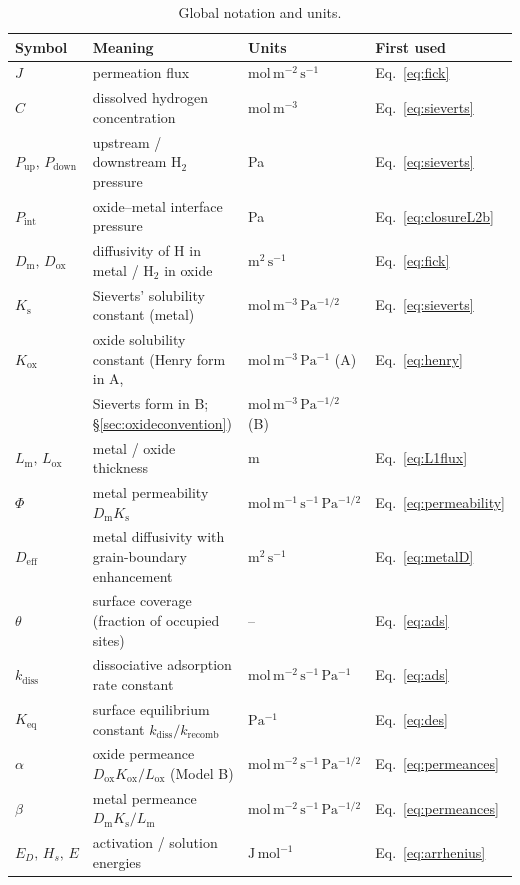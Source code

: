 \documentclass[11pt,a4paper]{article}
\newcommand{\Pup}{P_{\mathrm{up}}}
\newcommand{\Pdown}{P_{\mathrm{down}}}
\newcommand{\Pint}{P_{\mathrm{int}}}
\newcommand{\Ks}{K_{\mathrm{s}}}
\newcommand{\Kox}{K_{\mathrm{ox}}}
\newcommand{\Keq}{K_{\mathrm{eq}}}
\newcommand{\Dm}{D_{\mathrm{m}}}
\newcommand{\Dox}{D_{\mathrm{ox}}}
\newcommand{\Deff}{D_{\mathrm{eff}}}
\newcommand{\Lm}{L_{\mathrm{m}}}
\newcommand{\Lox}{L_{\mathrm{ox}}}
\newcommand{\kdiss}{k_{\mathrm{diss}}}
\newcommand{\krec}{k_{\mathrm{recomb}}}
\begin{document}
\begin{table}[h]
\centering
\caption{Global notation and units.}
\label{tab:notation}
\begin{tabular}{llll}
\toprule
Symbol & Meaning & Units & First used \\
\midrule
$J$ & permeation flux & $\mathrm{mol\,m^{-2}\,s^{-1}}$ & Eq.~\eqref{eq:fick} \\
$C$ & dissolved hydrogen concentration & $\mathrm{mol\,m^{-3}}$ & Eq.~\eqref{eq:sieverts} \\
$\Pup,\,\Pdown$ & upstream / downstream $\mathrm{H_2}$ pressure & Pa & Eq.~\eqref{eq:sieverts} \\
$\Pint$ & oxide--metal interface pressure & Pa & Eq.~\eqref{eq:closureL2b} \\
$\Dm,\,\Dox$ & diffusivity of H in metal / $\mathrm{H_2}$ in oxide & $\mathrm{m^2\,s^{-1}}$ & Eq.~\eqref{eq:fick} \\
$\Ks$ & Sieverts' solubility constant (metal) & $\mathrm{mol\,m^{-3}\,Pa^{-1/2}}$ & Eq.~\eqref{eq:sieverts} \\
$\Kox$ & oxide solubility constant (Henry form in A, & $\mathrm{mol\,m^{-3}\,Pa^{-1}}$ (A) & Eq.~\eqref{eq:henry} \\
 & \quad Sieverts form in B; \S\ref{sec:oxideconvention}) & $\mathrm{mol\,m^{-3}\,Pa^{-1/2}}$ (B) & \\
$\Lm,\,\Lox$ & metal / oxide thickness & m & Eq.~\eqref{eq:L1flux} \\
$\Phi$ & metal permeability $\Dm\Ks$ & $\mathrm{mol\,m^{-1}\,s^{-1}\,Pa^{-1/2}}$ & Eq.~\eqref{eq:permeability} \\
$\Deff$ & metal diffusivity with grain-boundary enhancement & $\mathrm{m^2\,s^{-1}}$ & Eq.~\eqref{eq:metalD} \\
$\theta$ & surface coverage (fraction of occupied sites) & -- & Eq.~\eqref{eq:ads} \\
$\kdiss$ & dissociative adsorption rate constant & $\mathrm{mol\,m^{-2}\,s^{-1}\,Pa^{-1}}$ & Eq.~\eqref{eq:ads} \\
$\Keq$ & surface equilibrium constant $\kdiss/\krec$ & $\mathrm{Pa^{-1}}$ & Eq.~\eqref{eq:des} \\
$\alpha$ & oxide permeance $\Dox\Kox/\Lox$ (Model B) & $\mathrm{mol\,m^{-2}\,s^{-1}\,Pa^{-1/2}}$ & Eq.~\eqref{eq:permeances} \\
$\beta$ & metal permeance $\Dm\Ks/\Lm$ & $\mathrm{mol\,m^{-2}\,s^{-1}\,Pa^{-1/2}}$ & Eq.~\eqref{eq:permeances} \\
$E_D,\,H_s,\,E$ & activation / solution energies & $\mathrm{J\,mol^{-1}}$ & Eq.~\eqref{eq:arrhenius} \\
\bottomrule
\end{tabular}
\end{table}
\end{document}
